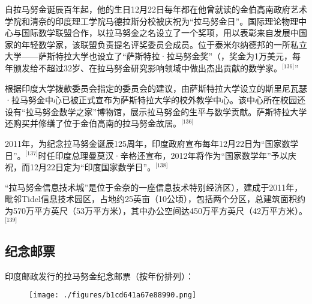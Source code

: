 自拉马努金诞辰百年起，他的生日12月22日每年都在他曾就读的金伯高南政府艺术学院和清奈的印度理工学院马德拉斯分校被庆祝为“拉马努金日”。国际理论物理中心与国际数学联盟合作，以拉马努金之名设立了一个奖项，用以表彰来自发展中国家的年轻数学家，该联盟负责提名评奖委员会成员。位于泰米尔纳德邦的一所私立大学——萨斯特拉大学也设立了“萨斯特拉·拉马努金奖”（，奖金为1万美元，每年颁发给不超过32岁、在拉马努金研究影响领域中做出杰出贡献的数学家。\(^\text{[136]}\)”

根据印度大学拨款委员会指定的委员会的建议，由萨斯特拉大学设立的斯里尼瓦瑟·拉马努金中心已被正式宣布为萨斯特拉大学的校外教学中心。该中心所在校园还设有“拉马努金数学之家”博物馆，展示拉马努金的生平与数学贡献。萨斯特拉大学还购买并修缮了位于金伯高南的拉马努金故居。\(^\text{[136]}\)

2011年，为纪念拉马努金诞辰125周年，印度政府宣布每年12月22日为“国家数学日”。\(^\text{[137]}\)时任印度总理曼莫汉·辛格还宣布，2012年将作为“国家数学年”予以庆祝，而12月22日定为“印度国家数学日”。\(^\text{[138]}\)

“拉马努金信息技术城”是位于金奈的一座信息技术特别经济区），建成于2011年，毗邻Tidel信息技术园区，占地约25英亩（10公顷），包括两个分区，总建筑面积约为570万平方英尺（53万平方米），其中办公空间达450万平方英尺（42万平方米）。\(^\text{[139]}\)
\subsection{纪念邮票}
印度邮政发行的拉马努金纪念邮票（按年份排列）：
\begin{figure}[ht]
\centering
\texttt{[image: ./figures/b1cd641a67e88990.png]}
\caption{} \label{fig_LMLJ_9}
\end{figure}
